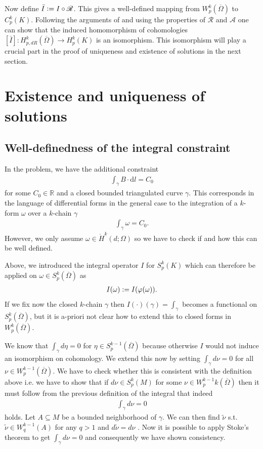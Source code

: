 \documentclass[12pt,a4paper]{article}
\theoremstyle{definition}
\newcommand{\aop}{\mathscr{A}}
\newcommand{\omegabar}{\overline{\Omega}}
\newcommand{\real}{\mathbb{R}}
\newcommand{\rop}{\mathscr{R}} %
\begin{document}
Now define $\bar{I} \vcentcolon= I \circ \rop$. This gives a well-defined 
mapping from $W^k_p(\omegabar)$ to $C^k_p(K)$. Following the arguments of 
\cite{goldshtein} and using the properties of $\rop$ and $\aop$ one can show 
that the induced homomorphism of cohomologies 
$[\bar{I}]: H^k_{p,dR}(\omegabar) \rightarrow H^k_p(K)$ is an isomorphism.
This isomorphism will play a crucial part in the proof of uniqueness and 
existence of solutions in the next section.


\section{Existence and uniqueness of solutions}
\subsection{Well-definedness of the integral constraint} 
\label{well_definedness_integral}


In the problem, we have the additional constraint 
\begin{align*}
    \int_\gamma B \cdot \text{d}l = C_0
\end{align*}
for some $C_0 \in \real$ and a closed bounded triangulated curve $\gamma$.
This corresponds in the language of differential forms in the general case
to the integration of a $k$-form $\omega$
over a $k$-chain $\gamma$
\begin{align*}
    \int_\gamma \omega  = C_0.
\end{align*}
However, we only assume 
$\omega \in \mathring{H}^k(d;\Omega)$ so we have to check if and how this can
be well defined.

Above, we introduced the integral operator $I$ for $S^k_p(K)$ which can 
therefore be applied on $\omega \in S^k_p(\omegabar)$ as
\begin{align*}
    I(\omega) \vcentcolon= I (\varphi(\omega)).
\end{align*}
\noindent If we fix now the closed 
$k$-chain $\gamma$ then $I(\cdot)(\gamma) = \int_\gamma$ becomes a functional on
$S^k_p(\omegabar)$, but it is a-priori not clear how to extend this to closed forms in
$W_p^k(\omegabar)$. 

We know that $\int_\gamma d\eta = 0$ for $\eta \in S^{k-1}_p(\omegabar)$ because 
otherwise $I$ would not induce an isomorphism on cohomology. We extend this now
by setting $\int_\gamma d\nu = 0$ for all $\nu \in W^{k-1}_p(\omegabar)$. 
We have to check whether this is consistent with the definition above i.e. we
have to show that if $d\nu \in S^k_p(M)$ for some 
$\nu \in W_p^{k-1}k(\omegabar)$ then 
it must follow from the previous definition of the integral that indeed
\begin{align*}
    \int_\gamma d\nu = 0
\end{align*}
holds.
Let $A \subseteq M$ be a bounded neighborhood of $\gamma$. We can then find 
$\tilde{\nu}$ s.t.  $\tilde{\nu} \in W^{k-1}_q(A)$ for any $q > 1$ and 
$d\tilde{\nu} = d\nu$ \cite[Thm 3.1.1]{schwarz}. Now it is possible to apply 
Stoke's theorem \cite[Thm. 9]{goldshtein_integration} to get  
$\int_\gamma d\nu = 0$ and consequently we have shown consistency.
\end{document}
